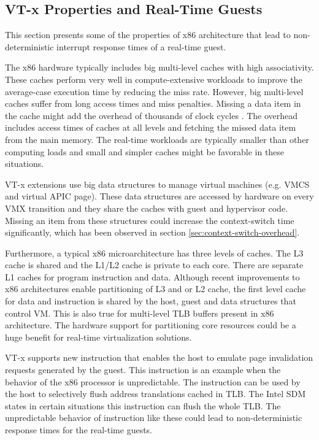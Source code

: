 \subsection {VT-x Properties and Real-Time Guests}
This section presents some of the properties of x86 architecture that lead to non-deterministic interrupt response times of a real-time guest.

The x86 hardware typically includes big multi-level caches with high associativity. These caches perform very well in compute-extensive workloads to improve the average-case execution time by reducing the miss rate.
However, big multi-level caches suffer from long access times and miss penalties. 
Missing a data item in the cache might add the overhead of thousands of clock cycles \cite{hennessy2011computer}. 
The overhead includes access times of caches at all levels and fetching the missed data item from the main memory.
The real-time workloads are typically smaller than other computing loads and small and simpler caches might be favorable in these situations.

VT-x extensions use big data structures to manage virtual machines (e.g. VMCS and virtual APIC page).
These data structures are accessed by hardware on every VMX transition and they share the caches with guest and hypervisor code. 
Missing an item from these structures could increase the context-switch time significantly, which has been observed in section \ref{sec:context-switch-overhead}. 

Furthermore, a typical x86 microarchitecture has three levels of caches. The L3 cache is shared and the L1/L2 cache is private to each core.
There are separate L1 caches for program instruction and data.
Although recent improvements to x86 architectures enable partitioning of L3 and or L2 cache, the first level cache for data and instruction is shared by the host, guest and data structures that control VM. This is also true for multi-level TLB buffers present in x86 architecture.
The hardware support for partitioning core resources could be a huge benefit for real-time virtualization solutions. 

VT-x supports new instruction \mINVVPID{} that enables the host to emulate page invalidation requests generated by the guest.
This instruction is an example when the behavior of the x86 processor is unpredictable.
The instruction can be used by the host to selectively flush address translations cached in TLB.
The Intel SDM \cite{intel-sdm-vol3} states in certain situations this instruction can flush the whole TLB. 
The unpredictable behavior of instruction like these could lead to non-deterministic response times for the real-time guests.
